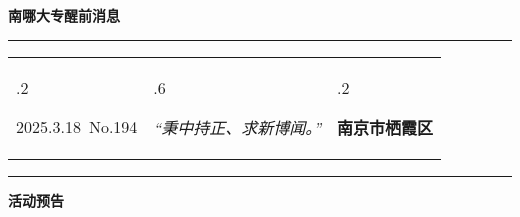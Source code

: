 \documentclass[letterpaper, 12pt]{article}
\begin{document}
\begin{center}
    \Huge\textbf{南哪大专醒前消息}
\end{center}
\vspace{4mm}
\hrule
\renewcommand\tabularxcolumn[1]{m{#1}}
\begin{tabularx}{\textwidth}{>{\hsize.2\hsize}X>{\hsize.6\hsize}X>{\hsize.2\hsize}X}
    \begin{flushleft}
        2025.3.18\, No.194
    \end{flushleft}
    &
    \begin{center}
        \textit{“秉中持正、求新博闻。”}
    \end{center}
    &
    \begin{flushright}
        \textbf{南京市栖霞区}
    \end{flushright}
\end{tabularx}
\vspace{-3.5mm}
\hrule
\vspace{4mm}
\centerline{\huge\textbf{活动预告}}
\end{document}
